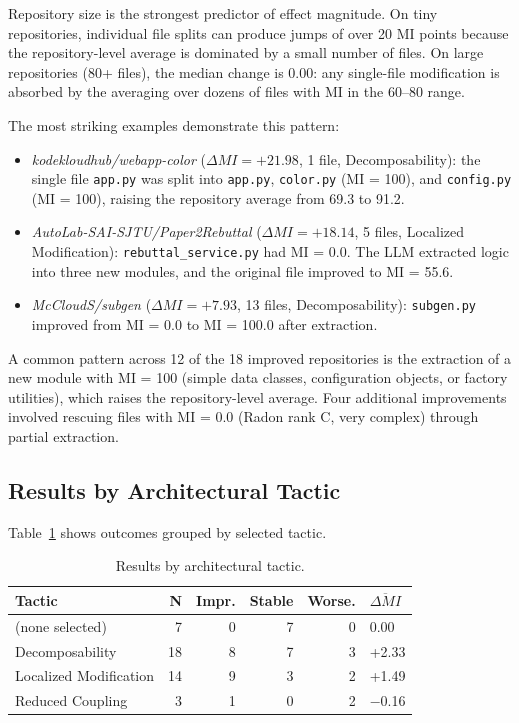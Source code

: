 \documentclass[sigconf,review,anonymous]{acmart}
\begin{document}
Repository size is the strongest predictor of effect magnitude. On tiny repositories, individual file splits can produce jumps of over 20 MI points because the repository-level average is dominated by a small number of files. On large repositories (80+ files), the median change is 0.00: any single-file modification is absorbed by the averaging over dozens of files with MI in the 60--80 range.

The most striking examples demonstrate this pattern:

\begin{itemize}[nosep]
    \item \textit{kodekloudhub/webapp-color} ($\Delta MI = +21.98$, 1 file, Decomposability): the single file \texttt{app.py} was split into \texttt{app.py}, \texttt{color.py} (MI = 100), and \texttt{config.py} (MI = 100), raising the repository average from 69.3 to 91.2.
    \item \textit{AutoLab-SAI-SJTU/Paper2Rebuttal} ($\Delta MI = +18.14$, 5 files, Localized Modification): \texttt{rebuttal\_service.py} had MI = 0.0. The LLM extracted logic into three new modules, and the original file improved to MI = 55.6.
    \item \textit{McCloudS/subgen} ($\Delta MI = +7.93$, 13 files, Decomposability): \texttt{subgen.py} improved from MI = 0.0 to MI = 100.0 after extraction.
\end{itemize}

A common pattern across 12 of the 18 improved repositories is the extraction of a new module with MI = 100 (simple data classes, configuration objects, or factory utilities), which raises the repository-level average. Four additional improvements involved rescuing files with MI = 0.0 (Radon rank C, very complex) through partial extraction.

\subsection{Results by Architectural Tactic}

Table~\ref{tab:exp5_tactics} shows outcomes grouped by selected tactic.

\begin{table}[H]
\centering
\small
\caption{Results by architectural tactic.}
\label{tab:exp5_tactics}
\begin{tabular}{lrrrrl}
\toprule
\textbf{Tactic} & \textbf{N} & \textbf{Impr.} & \textbf{Stable} & \textbf{Worse.} & $\overline{\Delta MI}$ \\
\midrule
(none selected)       & 7  & 0 & 7 & 0 & 0.00  \\
Decomposability       & 18 & 8 & 7 & 3 & +2.33 \\
Localized Modification & 14 & 9 & 3 & 2 & +1.49 \\
Reduced Coupling      & 3  & 1 & 0 & 2 & $-$0.16 \\
\bottomrule
\end{tabular}
\end{table}
\end{document}
